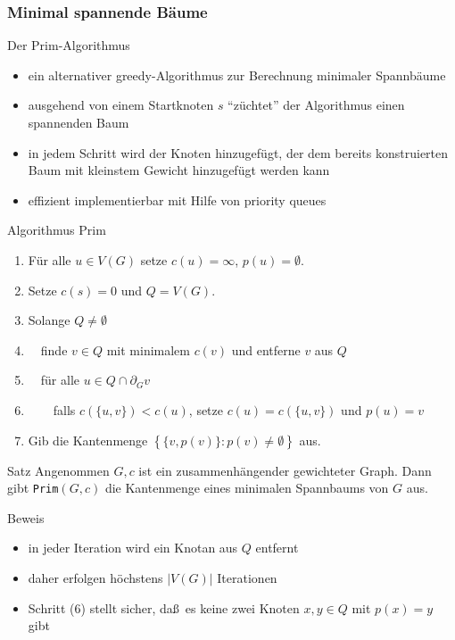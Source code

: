 \documentclass[aspectratio=1610, 11pt]{beamer}
\newcommand\cbc[1]{\left\{{#1}\right\}}
\newcommand{\mytitle}{Minimal spannende B\"aume}
\begin{document}
\begin{frame}\frametitle{\mytitle}
	\begin{overprint}
		\begin{exampleblock}{Der Prim-Algorithmus}
			\begin{itemize}
				\item ein alternativer greedy-Algorithmus zur Berechnung minimaler Spannb\"aume
				\item ausgehend von einem Startknoten $s$ ``z\"uchtet'' der Algorithmus einen spannenden Baum
				\item in jedem Schritt wird der Knoten hinzugef\"ugt, der dem bereits konstruierten Baum mit kleinstem Gewicht hinzugef\"ugt werden kann
				\item effizient implementierbar mit Hilfe von priority queues
			\end{itemize}
		\end{exampleblock}
		\begin{exampleblock}{Algorithmus Prim}
	\begin{enumerate}
		\item F\"ur alle $u\in V(G)$ setze $c(u)=\infty$, $p(u)=\emptyset$.
		\item Setze $c(s)=0$ und $Q=V(G)$.
		\item Solange $Q\neq\emptyset$
		\item $\quad$finde $v\in Q$ mit minimalem $c(v)$ und entferne $v$ aus $Q$
		\item $\quad$f\"ur alle $u\in Q\cap\partial_Gv$
		\item $\quad\quad$falls $c(\{u,v\})<c(u)$, setze $c(u)=c(\{u,v\})$ und $p(u)=v$
		\item Gib die Kantenmenge $\cbc{\{v,p(v)\}:p(v)\neq\emptyset}$ aus.
	\end{enumerate}
		\end{exampleblock}
\begin{block}{Satz}
	Angenommen $G,c$ ist ein zusammenh\"angender gewichteter Graph.
	Dann gibt {\tt Prim}$(G,c)$ die Kantenmenge eines minimalen Spannbaums von $G$ aus.
\end{block}
\begin{exampleblock}{Beweis}
	\begin{itemize}
		\item in jeder Iteration wird ein Knotan aus $Q$ entfernt
		\item daher erfolgen h\"ochstens $|V(G)|$ Iterationen
		\item Schritt (6) stellt sicher, da\ss\ es keine zwei Knoten $x,y\in Q$ mit $p(x)=y$ gibt

\end{itemize}
\end{exampleblock}
\end{overprint}
\end{frame}
\end{document}
